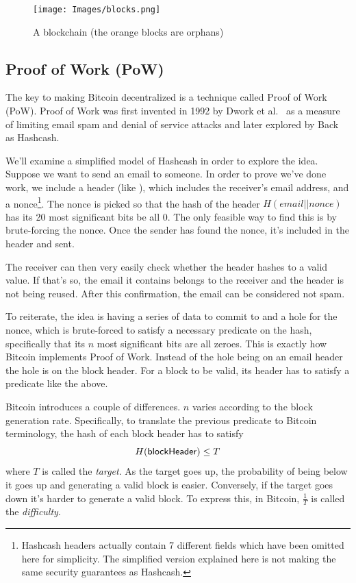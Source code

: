 \begin{figure}[H]
  \centering
  \texttt{[image: Images/blocks.png]}
  \caption{A blockchain (the orange blocks are orphans)~\cite{mastering}}
  \label{fig:blocks}
\end{figure}

\subsection{\label{proofOfWork}Proof of Work (PoW)}
The key to making Bitcoin decentralized is a technique called Proof of Work (PoW). Proof of Work was first invented in 1992 by Dwork et al.~\cite{dwork} as a measure of limiting email spam and denial of service attacks and later explored by Back~\cite{hashcash} as Hashcash.

We'll examine a simplified model of Hashcash in order to explore the idea. Suppose we want to send an email to someone. In order to prove we've done work, we include a header (like ), which includes the receiver's email address, and a nonce\footnote{Hashcash headers actually contain 7 different fields which have been omitted here for simplicity. The simplified version explained here is not making the same security guarantees as Hashcash.}. The nonce is picked so that the hash of the header $H(email || nonce)$ has its 20 most significant bits be all 0. The only feasible way to find this is by brute-forcing the nonce. Once the sender has found the nonce, it's included in the header and sent.

The receiver can then very easily check whether the header hashes to a valid value. If that's so, the email it contains belongs to the receiver and the header is not being reused. After this confirmation, the email can be considered not spam.

To reiterate, the idea is having a series of data to commit to and a hole for the nonce, which is brute-forced to satisfy a necessary predicate on the hash, specifically that its $n$ most significant bits are all zeroes. This is exactly how Bitcoin implements Proof of Work. Instead of the hole being on an email header the hole is on the block header. For a block to be valid, its header has to satisfy a predicate like the above.

Bitcoin introduces a couple of differences. $n$ varies according to the block generation rate. Specifically, to translate the previous predicate to Bitcoin terminology, the hash of each block header has to satisfy \begin{equation} \label{eq:PoW}
  H({\sf blockHeader}) \le T
\end{equation}
where $T$ is called the \emph{target}. As the target goes up, the probability of being below it goes up and generating a valid block is easier. Conversely, if the target goes down it's harder to generate a valid block. To express this, in Bitcoin, $\frac{1}{T}$ is called the \emph{difficulty}.

